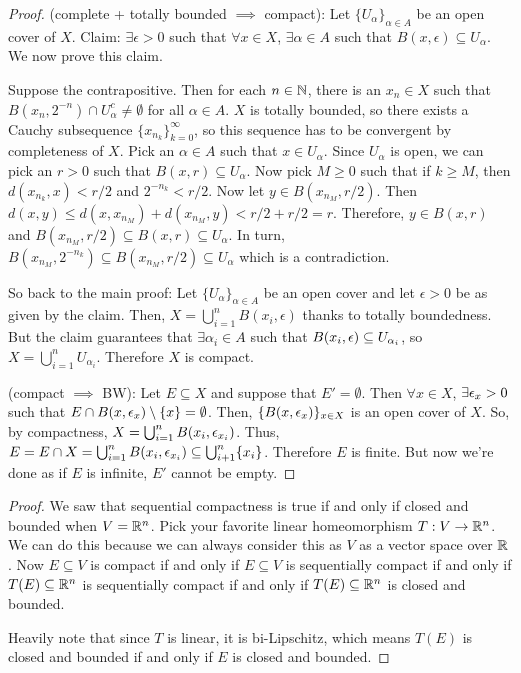 \documentclass{report}
\begin{document}
\begin{proof}
    (complete + totally bounded $\implies$ compact): Let $\{U_\alpha\}_{\alpha \in A}$ be an open cover of $X$. Claim: $\exists \epsilon > 0$ such that $\forall x \in X$, $\exists \alpha \in A$ such that $B(x, \epsilon) \subseteq U_\alpha$. We now prove this claim.

    Suppose the contrapositive. Then for each $n \in \NN$, there is an $x_n \in X$ such that $B(x_n, 2^{-n}) \cap U_\alpha^c \neq \emptyset$ for all $\alpha \in A$. $X$ is totally bounded, so there exists a Cauchy subsequence $\{x_{n_k}\}_{k=0}^\infty$, so this sequence has to be convergent by completeness of $X$. Pick an $\alpha \in A$ such that $x \in U_\alpha$. Since $U_\alpha$ is open, we can pick an $r > 0$ such that $B(x, r) \subseteq U_\alpha$. Now pick $M \geq 0$ such that if $k \geq M$, then $d(x_{n_k}, x) < r/2$ and $2^{-n_k} < r/2$. Now let $y \in B(x_{n_M}, r/2)$. Then $d(x, y) \leq d(x, x_{n_M}) + d(x_{n_M}, y) < r/2 + r/2 = r$. Therefore, $y \in B(x, r)$ and $B(x_{n_M}, r/2) \subseteq B(x, r) \subseteq U_\alpha$. In turn, $B(x_{n_M}, 2^{-n_k}) \subseteq B(x_{n_M}, r/2) \subseteq U_\alpha$ which is a contradiction. 

    So back to the main proof: Let $\{U_\alpha\}_{\alpha \in A}$ be an open cover and let $\epsilon > 0$ be as given by the claim. Then, $X = \bigcup_{i=1}^n B(x_i, \epsilon)$ thanks to totally boundedness. But the claim guarantees that $\exists \alpha_i \in A$ such that $B(x_i, \epsilon) \subseteq U_{\alpha_i}$, so $X = \bigcup_{i=1}^n U_{\alpha_i}$. Therefore $X$ is compact.

    (compact $\implies$ BW): Let $E \subseteq X$ and suppose that $E' = \emptyset$. Then $\forall x  \in X$, $\exists \epsilon_x > 0$ such that $E \cap B(x, \epsilon_x) \setminus \{x\} = \emptyset$. Then, $\{B(x, \epsilon_x)\}_{x\in X}$ is an open cover of $X$. So, by compactness, $X = \bigcup_{i=1}^n B(x_i, \epsilon_{x_i})$. Thus, $E = E \cap X = \bigcup_{i=1}^n B(x_i, \epsilon_{x_i}) \subseteq \bigcup_{i+1}^n \{x_i\}$. Therefore $E$ is finite. But now we're done as if $E$ is infinite, $E'$ cannot be empty. 
\end{proof}
\begin{proof}
    We saw that sequential compactness is true if and only if closed and bounded when $V = \RR^n$. Pick your favorite linear homeomorphism $T : V \to \RR^n$. We can do this because we can always consider this as $V$ as a vector space over $\RR$. Now $E \subseteq V$ is compact if and only if $E\subseteq V$ is sequentially compact if and only if $T(E) \subseteq \RR^n$ is sequentially compact if and only if $T(E) \subseteq \RR^n$ is closed and bounded.

    Heavily note that since $T$ is linear, it is bi-Lipschitz, which means $T(E)$ is closed and bounded if and only if $E$ is closed and bounded.
\end{proof}
\newpage
\end{document}
